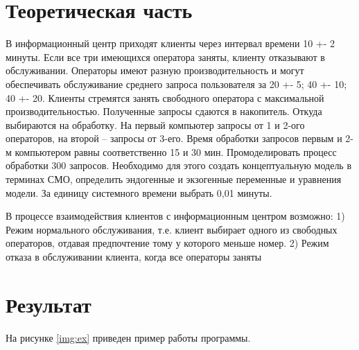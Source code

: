 \documentclass[a4paper, 14pt, unknownkeysallowed]{extreport}
\begin{document}

\setcounter{page}{2}

\chapter{Теоретическая часть}
В информационный центр приходят клиенты через интервал времени 10 +- 2 минуты. Если все три имеющихся оператора заняты, клиенту отказывают в обслуживании. Операторы имеют разную производительность и могут обеспечивать обслуживание среднего запроса пользователя за 20 +- 5; 40 +- 10; 40 +- 20. Клиенты стремятся занять свободного оператора с максимальной производительностью. Полученные запросы сдаются в накопитель. Откуда выбираются на обработку. На первый компьютер запросы от 1 и 2-ого операторов, на второй – запросы от 3-его. Время обработки запросов первым и 2-м компьютером равны соответственно 15 и 30 мин. Промоделировать процесс обработки 300 запросов. 
Необходимо для этого создать концептуальную модель в терминах СМО, определить эндогенные и экзогенные переменные и уравнения модели. За единицу системного времени выбрать 0,01 минуты.


В процессе взаимодействия клиентов с информационным центром возможно:
1) Режим нормального обслуживания, т.е. клиент выбирает одного из свободных операторов, отдавая предпочтение тому у которого меньше номер.
2) Режим отказа в обслуживании клиента, когда все операторы заняты


\chapter{Результат}
На рисунке \ref{img:ex} приведен пример работы программы.
\end{document}
